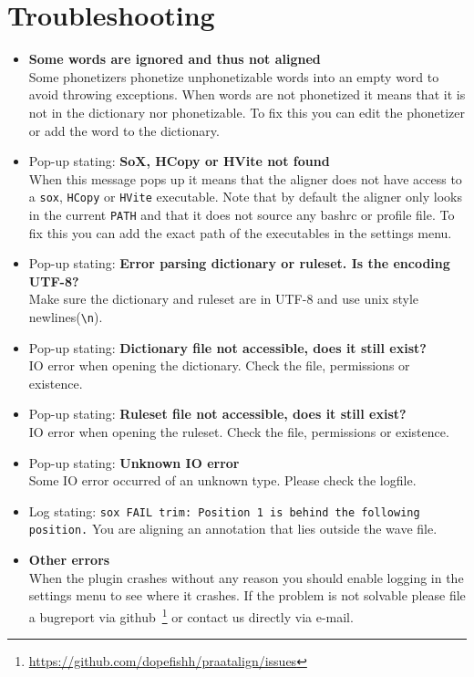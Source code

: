 \section{Troubleshooting}
\begin{itemize}
	\item \textbf{Some words are ignored and thus not aligned}\\
		Some phonetizers phonetize unphonetizable words into an empty word to avoid
		throwing exceptions. When words are not phonetized it means that it is not
		in the dictionary nor phonetizable. To fix this you can edit the phonetizer
		or add the word to the dictionary.
	\item Pop-up stating: \textbf{SoX, HCopy or HVite not found}\\
		When this message pops up it means that the aligner does not have access to
		a \texttt{sox}, \texttt{HCopy} or \texttt{HVite} executable. Note that by
		default the aligner only looks in the current \texttt{PATH} and that it
		does not source any bashrc or profile file. To fix this you can add the
		exact path of the executables in the settings menu.
	\item Pop-up stating: \textbf{Error parsing dictionary or ruleset. Is the
		encoding UTF-8?}\\
		Make sure the dictionary and ruleset are in UTF-8 and use unix style
		newlines(\texttt{\textbackslash n}).
	\item Pop-up stating: \textbf{Dictionary file not accessible, does it still
		exist?}\\
		IO error when opening the dictionary. Check the file, permissions or
		existence.
	\item Pop-up stating: \textbf{Ruleset file not accessible, does it still
		exist?}\\
		IO error when opening the ruleset. Check the file, permissions or
		existence.
	\item Pop-up stating: \textbf{Unknown IO error}\\
		Some IO error occurred of an unknown type. Please check the logfile.
	\item Log stating: \texttt{sox FAIL trim: Position 1 is behind the
		following position.}
		You are aligning an annotation that lies outside the wave file.
	\item \textbf{Other errors}\\
		When the plugin crashes without any reason you should enable logging in the
		settings menu to see where it crashes. If the problem is not solvable
		please file a bugreport via
		github~\footnote{\url{https://github.com/dopefishh/praatalign/issues}} or
		contact us directly via e-mail.
\end{itemize}

